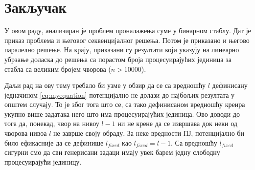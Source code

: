\section{Закључак}

У овом раду, анализиран је проблем проналажења суме у бинарном стаблу.
Дат је приказ проблема и његовог секвенцијалног решења.
Потом је приказано и његово паралелно решење.
На крају, приказани су резултати који указују на линеарно убрзање доласка до решења са порастом броја процесуирајућих јединица за стабла са великим бројем чворова ($n > 10 000$).

Даљи рад на ову тему требало би узме у обзир да се са вредношћу $l$ дефинисану једначином \ref{eq:myequation} потенцијално не долази до најбољих резултата у општем случају.
То је због тога што се, са тако дефинисаном вредношћу креира укупно више задатака него што има процесуирајућих јединица.
Ово доводи до тога да, понекад, чвор на нивоу $l-1$ ни не крене да се извршава док неки од чворова нивоа $l$ не заврше своју обраду.
За неке вредности ПЈ, потенцијално би било ефикасније да се дефинише $l_{fixed}$ као $l_{fixed} = l - 1$.
Са вредношћу $l_{fixed}$ сигурни смо да сви генерисани задаци имају увек барем једну слободну процесуирајући јединицу.